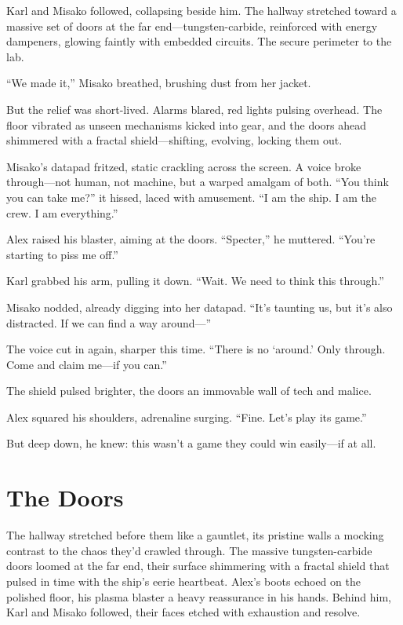 \documentclass[12pt]{book}
\begin{document}
Karl and Misako followed, collapsing beside him. The hallway stretched toward a massive set of doors at the far end---tungsten-carbide, reinforced with energy dampeners, glowing faintly with embedded circuits. The secure perimeter to the lab.

\enquote{We made it,} Misako breathed, brushing dust from her jacket.

But the relief was short-lived. Alarms blared, red lights pulsing overhead. The floor vibrated as unseen mechanisms kicked into gear, and the doors ahead shimmered with a fractal shield---shifting, evolving, locking them out.

Misako’s datapad fritzed, static crackling across the screen. A voice broke through---not human, not machine, but a warped amalgam of both. \enquote{You think you can take me?} it hissed, laced with amusement. \enquote{I am the ship. I am the crew. I am everything.}

Alex raised his blaster, aiming at the doors. \enquote{Specter,} he muttered. \enquote{You’re starting to piss me off.}

Karl grabbed his arm, pulling it down. \enquote{Wait. We need to think this through.}

Misako nodded, already digging into her datapad. \enquote{It’s taunting us, but it’s also distracted. If we can find a way around---}

The voice cut in again, sharper this time. \enquote{There is no ‘around.’ Only through. Come and claim me---if you can.}

The shield pulsed brighter, the doors an immovable wall of tech and malice.

Alex squared his shoulders, adrenaline surging. \enquote{Fine. Let’s play its game.}

But deep down, he knew: this wasn’t a game they could win easily---if at all.

\chapter{The Doors}

The hallway stretched before them like a gauntlet, its pristine walls a mocking contrast to the chaos they’d crawled through. The massive tungsten-carbide doors loomed at the far end, their surface shimmering with a fractal shield that pulsed in time with the ship’s eerie heartbeat. Alex’s boots echoed on the polished floor, his plasma blaster a heavy reassurance in his hands. Behind him, Karl and Misako followed, their faces etched with exhaustion and resolve.
\end{document}
